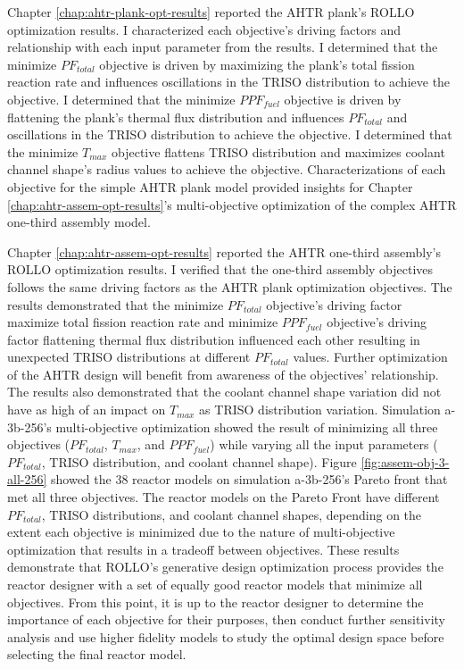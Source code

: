 Chapter \ref{chap:ahtr-plank-opt-results} reported the \gls{AHTR} plank's 
\gls{ROLLO} optimization results.
I characterized each objective's driving factors and relationship 
with each input parameter from the results. 
I determined that the minimize $PF_{total}$ objective is driven by maximizing the plank's 
total fission reaction rate and influences oscillations in the TRISO distribution to 
achieve the objective. 
I determined that the minimize $PPF_{fuel}$ objective is driven by flattening the plank's
thermal flux distribution and influences $PF_{total}$ and oscillations in the TRISO 
distribution to achieve the objective.
I determined that the minimize $T_{max}$ objective flattens TRISO distribution and 
maximizes coolant channel shape's radius values to achieve the objective.
Characterizations of each objective for the simple \gls{AHTR} plank model provided 
insights for Chapter \ref{chap:ahtr-assem-opt-results}'s multi-objective 
optimization of the complex \gls{AHTR} one-third assembly model. 

Chapter \ref{chap:ahtr-assem-opt-results} reported the \gls{AHTR} one-third assembly's
\gls{ROLLO} optimization results.
I verified that the one-third assembly objectives follows the same driving 
factors as the \gls{AHTR} plank optimization objectives. 
The results demonstrated that the minimize $PF_{total}$ objective's driving factor 
maximize total fission reaction rate and minimize $PPF_{fuel}$ objective's driving 
factor flattening thermal flux distribution influenced each other resulting in unexpected 
TRISO distributions at different $PF_{total}$ values. 
Further optimization of the \gls{AHTR} design will benefit from awareness 
of the objectives' relationship. 
The results also demonstrated that the coolant channel shape variation did 
not have as high of an impact on $T_{max}$ as \gls{TRISO} distribution variation.
Simulation a-3b-256's multi-objective optimization showed the result of minimizing all 
three objectives ($PF_{total}$, $T_{max}$, and $PPF_{fuel}$) while varying 
all the input parameters ($PF_{total}$, TRISO distribution, and coolant channel shape).
Figure \ref{fig:assem-obj-3-all-256} showed the 38 reactor models on simulation 
a-3b-256's Pareto front that met all three objectives. 
The reactor models on the Pareto Front have different $PF_{total}$, TRISO distributions, 
and coolant channel shapes, depending on the extent each objective is minimized due 
to the nature of multi-objective optimization that results in a tradeoff between 
objectives. 
These results demonstrate that \gls{ROLLO}'s generative design optimization process 
provides the reactor designer with a set of equally good reactor models that minimize 
all objectives.
From this point, it is up to the reactor designer to determine the importance of each 
objective for their purposes, then conduct further sensitivity analysis and 
use higher fidelity models to study the optimal design space before selecting 
the final reactor model.

